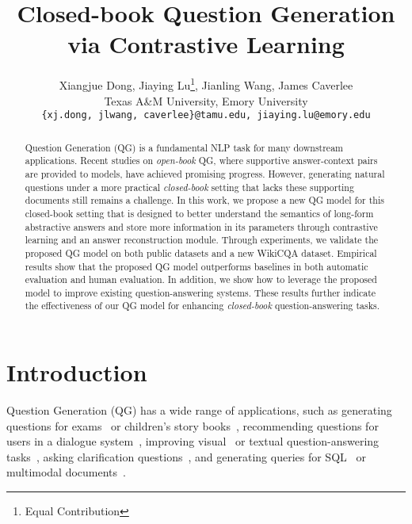 \documentclass[11pt]{article}
\title{Closed-book Question Generation via Contrastive Learning}
\author{Xiangjue Dong, Jiaying Lu\thanks{\hspace{0.2cm}Equal Contribution}, Jianling Wang\footnotemark[1], James Caverlee\\
         Texas A\&M University,  Emory University \\ \small\texttt{\{xj.dong, jlwang, caverlee\}@tamu.edu, jiaying.lu@emory.edu}}
\begin{document}
\maketitle
\begin{abstract}

Question Generation (QG) is a fundamental NLP task for many downstream applications. Recent studies on \textit{open-book} QG, where supportive answer-context pairs are provided to models, have achieved promising progress.
However, generating natural questions under a more practical \textit{closed-book} setting that lacks these supporting documents still remains a challenge.
In this work, we propose a new QG model for this closed-book setting that is designed to better understand the semantics of long-form abstractive answers and store more information in its parameters through contrastive learning and an answer reconstruction module.
Through experiments, we validate the proposed QG model on both public datasets and a new WikiCQA dataset. Empirical results show that the proposed QG model outperforms baselines in both automatic evaluation and human evaluation.
In addition, we show how to leverage the proposed model to improve existing question-answering systems. These results further indicate the effectiveness of our QG model for enhancing \textit{closed-book} question-answering tasks.













\end{abstract}

\section{Introduction}

Question Generation (QG) has a wide range of applications, such as generating questions for exams~\cite{jia-etal-2021-eqg, lelkes2021quiz, dugan2022feasibility} or children's story books~\cite{zhao-etal-2022-educational, Yao2022ItIA}, recommending questions for users in a dialogue system~\cite{shukla-etal-2019-ask, laban-etal-2020-whats}, improving visual~\cite{Li_2018_CVPR,lu2022good} or textual question-answering tasks~\cite{duan-etal-2017-question, lewis2019unsupervised, zhang2019addressing, sultan-etal-2020-importance, lyu-etal-2021-improving}, asking clarification questions~\cite{rao-daume-iii-2019-answer, yu-etal-2020-interactive, ren-etal-2021}, and generating queries for SQL~\cite{wu2021data} or multimodal documents~\cite{kim-etal-2021-query}.
\end{document}
